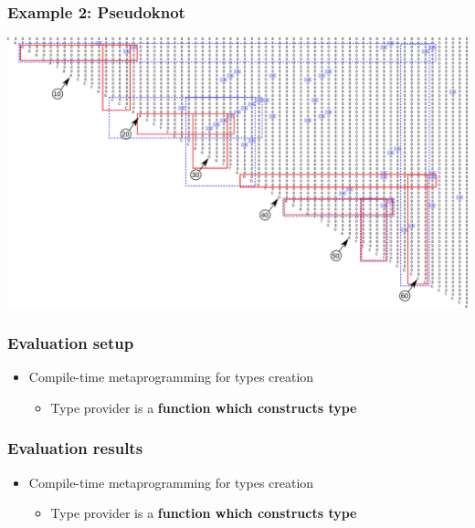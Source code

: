 \documentclass[xcolor=table]{beamer}
\begin{document}
\begin{frame}[fragile]
  \transwipe[direction=90]
  \frametitle{Example 2: Pseudoknot}
\centering
\includegraphics[width=\textwidth]{pictures/0m.pdf}
\end{frame}

\begin{frame}
  \transwipe[direction=90]
  \frametitle{Evaluation setup}
\begin{itemize}
 \item Compile-time metaprogramming for types creation
 \begin{itemize}
  \item Type provider is a \textbf{function which constructs type}
 \end{itemize}

\end{itemize}

\end{frame}

\begin{frame}
  \transwipe[direction=90]
  \frametitle{Evaluation results}
\begin{itemize}
 \item Compile-time metaprogramming for types creation
 \begin{itemize}
  \item Type provider is a \textbf{function which constructs type}
 \end{itemize}

\end{itemize}

\end{frame}
\end{document}
